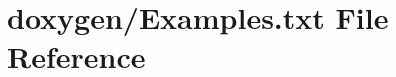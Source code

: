 \hypertarget{Examples_8txt}{\section{doxygen/\+Examples.txt File Reference}
\label{Examples_8txt}
}
